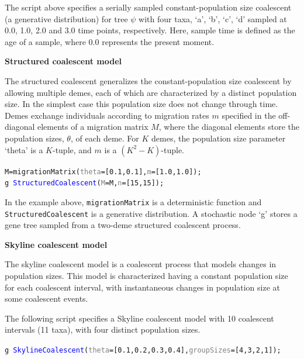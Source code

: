\documentclass[10pt,letterpaper,table]{article}
\theoremstyle{definition}
\begin{document}
The script above specifies a serially sampled constant-population size coalescent (a generative distribution) for tree $\psi$ with four taxa, `a', `b', `c', `d' sampled at 0.0, 1.0, 2.0 and 3.0 time points, respectively. 
Here, sample time is defined as the age of a sample, where 0.0 represents the present moment.
\newline

\textbf{Structured coalescent model}

The structured coalescent \cite{hudson1990oxford, notohara1990coalescent} generalizes the constant-population size coalescent \cite{kingman82} by allowing multiple demes, each of which are characterized by a distinct population size. 
In the simplest case this population size does not change through time.
Demes exchange individuals according to migration rates $m$ specified in the off-diagonal elements of a migration matrix $M$, where the diagonal elements store the population sizes, $\theta$, of each deme.
For $K$ demes, the population size parameter `theta' is a $K$-tuple, and $m$ is a $(K^2-K)$-tuple.

{\small
  \begin{alltt}
    M = \textcolor{generator}{migrationMatrix}(\textcolor{gray}{theta}=[\textcolor{constant}{0.1}, \textcolor{constant}{0.1}], \textcolor{gray}{m}=[\textcolor{constant}{1.0}, \textcolor{constant}{1.0}]);
    \textcolor{bluishgreen}{g} ~ \textcolor{blue}{StructuredCoalescent}(\textcolor{gray}{M}=M, \textcolor{gray}{n}=[\textcolor{constant}{15}, \textcolor{constant}{15}]);
  \end{alltt}
}

In the example above, \texttt{migrationMatrix} is a deterministic function and \texttt{StructuredCoalescent} is a generative distribution. 
A stochastic node `g' stores a gene tree sampled from a two-deme structured coalescent process.
\newline

\textbf{Skyline coalescent model}

The skyline coalescent model \cite{drummond2005bayesian} is a coalescent process that models changes in population sizes.
This model is characterized having a constant population size for each coalescent interval, with instantaneous changes in population size at some coalescent events.

The following script specifies a Skyline coalescent model with 10 coalescent intervals (11 taxa), with four distinct population sizes.

{\small
  \begin{alltt}
    \textcolor{bluishgreen}{g} ~ \textcolor{blue}{SkylineCoalescent}(\textcolor{gray}{theta}=[\textcolor{constant}{0.1}, \textcolor{constant}{0.2}, \textcolor{constant}{0.3}, \textcolor{constant}{0.4}], \textcolor{gray}{groupSizes}=[\textcolor{constant}{4},\textcolor{constant}{3},\textcolor{constant}{2},\textcolor{constant}{1}]);
  \end{alltt}
}
\end{document}
